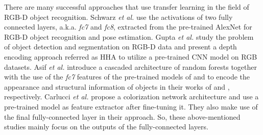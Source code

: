 \documentclass[10pt,journal,compsoc]{IEEEtran}
\begin{document}
There are many successful approaches that use transfer learning in the field of RGB-D object recognition. Schwarz \textit{et al.} use the activations of two fully connected layers, a.k.a. \textit{fc7} and \textit{fc8}, extracted from the pre-trained AlexNet \cite{Krizhevsky_NIPS_2012} for RGB-D object recognition and pose estimation. Gupta \textit{et al.} \cite{Gupta_ECCV_2014} study the problem of object detection and segmentation on RGB-D data and present a depth encoding approach referred as HHA to utilize a pre-trained CNN model on RGB datasets. Asif \textit{et al.} introduce a cascaded architecture of random forests together with the use of the \textit{fc7} features of the pre-trained models of \cite{Chatfield_BMVC_2014} and \cite{Simonyan_ICLR_2015} to encode the appearance and structural information of objects in their works of \cite{Asif_ICRA_2015} and \cite{Asif_ToR_2017}, respectively. Carlucci \textit{et al.} \cite{Carlucci_RAS_2018} propose a colorization network architecture and use a pre-trained model as feature extractor after fine-tuning it. They also make use of the final fully-connected layer in their approach. So, these above-mentioned studies mainly focus on the outputs of the fully-connected layers. 
\end{document}
